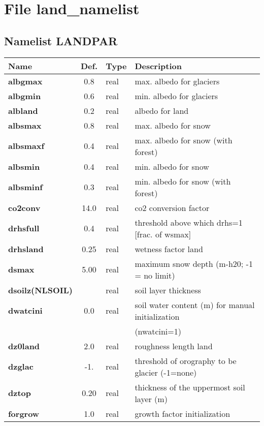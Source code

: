 \section{File land\_namelist}
\subsection{Namelist LANDPAR}
\begin{tabular}{|l|c|l|l|}                                  
\hline                                                        
Name   & Def. & Type & Description \\               
\hline                                                        
{\bf  albgmax  } & 0.8   & real & max. albedo for glaciers \\
{\bf  albgmin  } & 0.6   & real & min. albedo for glaciers \\
{\bf  albland  } & 0.2   & real & albedo for land \\
{\bf  albsmax  } & 0.8   & real & max. albedo for snow \\
{\bf  albsmaxf } & 0.4   & real & max. albedo for snow (with forest) \\
{\bf  albsmin  } & 0.4   & real & min. albedo for snow \\
{\bf  albsminf } & 0.3   & real & min. albedo for snow (with forest) \\
{\bf  co2conv  } & 14.0  & real & co2 conversion factor \\
{\bf  drhsfull } & 0.4   & real & threshold above which drhs=1 [frac. of wsmax] \\
{\bf  drhsland } & 0.25  & real & wetness factor land \\
{\bf  dsmax    } & 5.00  & real & maximum snow depth (m-h20; -1 = no limit) \\
{\bf  dsoilz(NLSOIL)} &       & real & soil layer thickness \\
{\bf  dwatcini}  & 0.0   & real & soil water content (m) for manual 
                                  initialization   \\
                 &       &      &      (nwatcini=1) \\
{\bf  dz0land  } & 2.0   & real & roughness length land \\
{\bf  dzglac   } & -1.   & real & threshold of orography to be glacier (-1=none) \\
{\bf  dztop    } & 0.20  & real & thickness of the uppermost soil layer (m) \\
{\bf  forgrow  } & 1.0   & real & growth factor initialization \\

\end{tabular}
